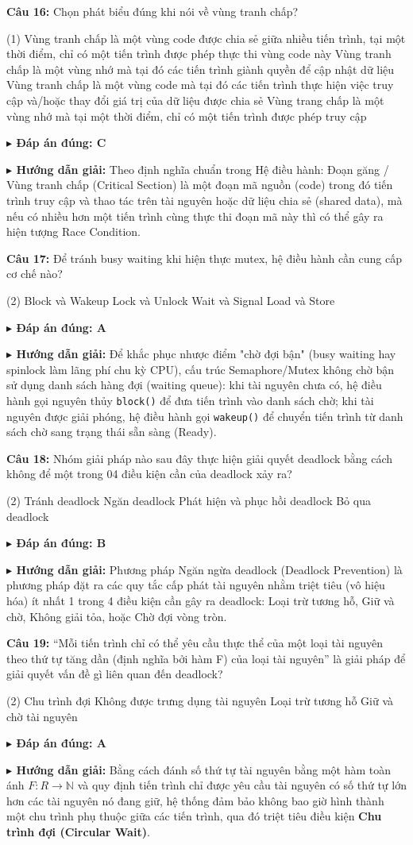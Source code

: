 \documentclass[11pt,a4paper]{article}
\newcommand{\giaithich}[2]{%
    \par\vspace{0.15cm}\noindent
    \begingroup\small
    \noindent\textbf{\color{blue}$\blacktriangleright$ Đáp án đúng: #1} \par\vspace{0.08cm}
    \noindent\textbf{\color{teal}$\blacktriangleright$ Hướng dẫn giải:} #2
    \endgroup\par\vspace{0.35cm}
}
\begin{document}
\noindent\textbf{Câu 16:} Chọn phát biểu đúng khi nói về vùng tranh chấp?
\begin{tasks}(1)
    \task Vùng tranh chấp là một vùng code được chia sẻ giữa nhiều tiến trình, tại một thời điểm, chỉ có một tiến trình được phép thực thi vùng code này
    \task Vùng tranh chấp là một vùng nhớ mà tại đó các tiến trình giành quyền để cập nhật dữ liệu
    \task Vùng tranh chấp là một vùng code mà tại đó các tiến trình thực hiện việc truy cập và/hoặc thay đổi giá trị của dữ liệu được chia sẻ
    \task Vùng trang chấp là một vùng nhớ mà tại một thời điểm, chỉ có một tiến trình được phép truy cập
\end{tasks}
\giaithich{C}{Theo định nghĩa chuẩn trong Hệ điều hành: Đoạn găng / Vùng tranh chấp (Critical Section) là một đoạn mã nguồn (code) trong đó tiến trình truy cập và thao tác trên tài nguyên hoặc dữ liệu chia sẻ (shared data), mà nếu có nhiều hơn một tiến trình cùng thực thi đoạn mã này thì có thể gây ra hiện tượng Race Condition.}

\noindent\textbf{Câu 17:} Để tránh busy waiting khi hiện thực mutex, hệ điều hành cần cung cấp cơ chế nào?
\begin{tasks}(2)
    \task Block và Wakeup
    \task Lock và Unlock
    \task Wait và Signal
    \task Load và Store
\end{tasks}
\giaithich{A}{Để khắc phục nhược điểm "chờ đợi bận" (busy waiting hay spinlock làm lãng phí chu kỳ CPU), cấu trúc Semaphore/Mutex không chờ bận sử dụng danh sách hàng đợi (waiting queue): khi tài nguyên chưa có, hệ điều hành gọi nguyên thủy \texttt{block()} để đưa tiến trình vào danh sách chờ; khi tài nguyên được giải phóng, hệ điều hành gọi \texttt{wakeup()} để chuyển tiến trình từ danh sách chờ sang trạng thái sẵn sàng (Ready).}

\noindent\textbf{Câu 18:} Nhóm giải pháp nào sau đây thực hiện giải quyết deadlock bằng cách không để một trong 04 điều kiện cần của deadlock xảy ra?
\begin{tasks}(2)
    \task Tránh deadlock
    \task Ngăn deadlock
    \task Phát hiện và phục hồi deadlock
    \task Bỏ qua deadlock
\end{tasks}
\giaithich{B}{Phương pháp Ngăn ngừa deadlock (Deadlock Prevention) là phương pháp đặt ra các quy tắc cấp phát tài nguyên nhằm triệt tiêu (vô hiệu hóa) ít nhất 1 trong 4 điều kiện cần gây ra deadlock: Loại trừ tương hỗ, Giữ và chờ, Không giải tỏa, hoặc Chờ đợi vòng tròn.}

\noindent\textbf{Câu 19:} “Mỗi tiến trình chỉ có thể yêu cầu thực thể của một loại tài nguyên theo thứ tự tăng dần (định nghĩa bởi hàm F) của loại tài nguyên” là giải pháp để giải quyết vấn đề gì liên quan đến deadlock?
\begin{tasks}(2)
    \task Chu trình đợi
    \task Không được trưng dụng tài nguyên
    \task Loại trừ tương hỗ
    \task Giữ và chờ tài nguyên
\end{tasks}
\giaithich{A}{Bằng cách đánh số thứ tự tài nguyên bằng một hàm toàn ánh $F: R \to \mathbb{N}$ và quy định tiến trình chỉ được yêu cầu tài nguyên có số thứ tự lớn hơn các tài nguyên nó đang giữ, hệ thống đảm bảo không bao giờ hình thành một chu trình phụ thuộc giữa các tiến trình, qua đó triệt tiêu điều kiện \textbf{Chu trình đợi (Circular Wait)}.}
\end{document}
